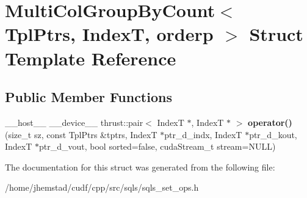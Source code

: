 \hypertarget{structMultiColGroupByCount}{}\section{Multi\+Col\+Group\+By\+Count$<$ Tpl\+Ptrs, IndexT, orderp $>$ Struct Template Reference}
\label{structMultiColGroupByCount}
\subsection*{Public Member Functions}
\begin{DoxyCompactItemize}
\item 
\+\_\+\+\_\+host\+\_\+\+\_\+ \+\_\+\+\_\+device\+\_\+\+\_\+ thrust\+::pair$<$ IndexT $\ast$, IndexT $\ast$ $>$ {\bfseries operator()} (size\+\_\+t sz, const Tpl\+Ptrs \&tptrs, IndexT $\ast$ptr\+\_\+d\+\_\+indx, IndexT $\ast$ptr\+\_\+d\+\_\+kout, IndexT $\ast$ptr\+\_\+d\+\_\+vout, bool sorted=false, cuda\+Stream\+\_\+t stream=N\+U\+LL)\hypertarget{structMultiColGroupByCount_a0a73661181c2935757a2f6e4fdd717b4}{}\label{structMultiColGroupByCount_a0a73661181c2935757a2f6e4fdd717b4}

\end{DoxyCompactItemize}


The documentation for this struct was generated from the following file\+:\begin{DoxyCompactItemize}
\item 
/home/jhemstad/cudf/cpp/src/sqls/sqls\+\_\+set\+\_\+ops.\+h\end{DoxyCompactItemize}
